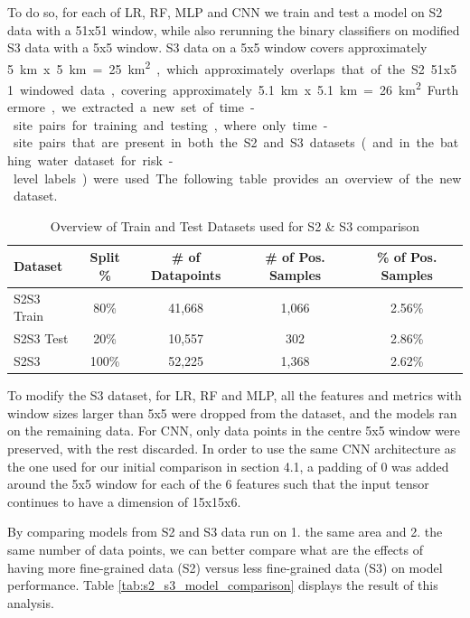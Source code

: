 \documentclass[a4paper,11pt]{report}
\begin{document}
To do so, for each of LR, RF, MLP and CNN we train and test a model on S2 data with a 51x51 window, while also rerunning the binary classifiers on modified S3 data with a 5x5 window. S3 data on a 5x5 window covers approximately \SI{5}km x \SI{5} km = \SI{25}{\km\squared}, which approximately overlaps that of the S2 51x51 windowed data, covering approximately \SI{5.1}km x \SI{5.1}km = \SI{26}{\km\squared}. Furthermore, we extracted a new set of time-site pairs for training and testing, where only time-site pairs that are present in both the S2 and S3 datasets (and in the bathing water dataset for risk-level labels) were used. The following table provides an overview of the new dataset.  


\begin{table}[h]
        \caption{Overview of Train and Test Datasets used for S2 \& S3 comparison}
        \label{table:s2s3_train_test}
        \centering
        \begin{tabular}{lcccc}
        \toprule
        \textbf{Dataset} & \textbf{Split \%} & \textbf{\# of Datapoints} &  \textbf{\# of Pos. Samples} & \textbf{\% of Pos. Samples} \\
        \midrule
        S2S3 Train & 80\% & 41,668 & 1,066 & 2.56\% \\
        S2S3 Test & 20\% & 10,557 & 302 & 2.86\% \\ 
        \midrule
        S2S3 & 100\% & 52,225 & 1,368 & 2.62\% \\
        \bottomrule
        \end{tabular}
\end{table}

To modify the S3 dataset, for LR, RF and MLP, all the features and metrics with window sizes larger than 5x5 were dropped from the dataset, and the models ran on the remaining data. For CNN, only data points in the centre 5x5 window were preserved, with the rest discarded. In order to use the same CNN architecture as the one used for our initial comparison in section 4.1, a padding of 0 was added around the 5x5 window for each of the 6 features such that the input tensor continues to have a dimension of 15x15x6. 

By comparing models from S2 and S3 data run on 1. the same area and 2. the same number of data points, we can better compare what are the effects of having more fine-grained data (S2) versus less fine-grained data (S3) on model performance. Table \ref{tab:s2_s3_model_comparison} displays the result of this analysis. 
\end{document}
